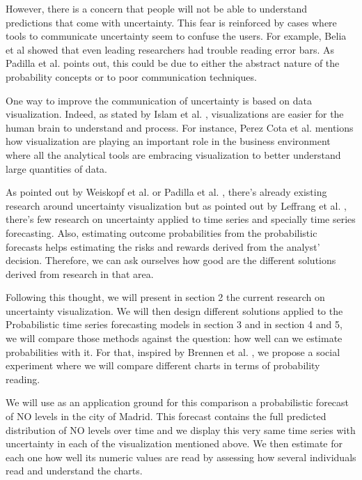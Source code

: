 \documentclass[a4paper,3p,sort&compress]{elsarticle}
\begin{document}
However, there is a concern that people will not be able to understand predictions that come with uncertainty.
This fear is reinforced by cases where tools to communicate uncertainty seem to confuse the users. For example,
Belia et al \cite{belia_researchers_2005} showed that even leading researchers had 
trouble reading error bars. 
As Padilla et al. \cite{padilla_uncertainty_2021} 
points out, this could be due to either the abstract nature of the probability concepts or to poor communication techniques. 

One way to improve the communication of uncertainty is based on data visualization. Indeed, as 
stated by Islam et al. \cite{islam_overview_2019}, visualizations are easier for the human brain to understand and process.
For instance, Perez Cota et al. \cite{cota_importance_2014} mentions how visualization are playing an important role in the business 
environment where all the analytical tools are embracing visualization to better understand large quantities of data. 

As pointed out by Weiskopf et al. \cite{weiskopf_uncertainty_2022} or Padilla et al. \cite{padilla_uncertainty_2021}, 
there's already existing research around uncertainty visualization 
but as pointed out by Leffrang et al. \cite{leffrang_should_2021}, there's few research on uncertainty applied to time series 
and specially time series forecasting. Also, 
estimating outcome probabilities from the probabilistic forecasts helps estimating the risks and rewards derived from the analyst'
decision. Therefore, we can ask ourselves how good are the different solutions derived from research in that area. 

Following this thought, we will present in section 2 the current research on uncertainty visualization. We will then
design different solutions applied to the Probabilistic time series forecasting models in section 3 and in section 4 and 5,
we will compare those methods against the question: how well can we estimate probabilities with it. 
For that, inspired by Brennen et al. \cite{brennen_instrument_2018}, we propose a social experiment where we will compare different charts 
in terms of probability reading. 

We will use as an application ground for this comparison a probabilistic forecast of NO levels 
in the city of Madrid. This forecast contains the full predicted distribution of NO levels over time
and we display this very same time series with uncertainty in each of the visualization mentioned above. 
We then estimate for each one how well its numeric values are read by assessing how several individuals read 
and understand the charts.
\end{document}
